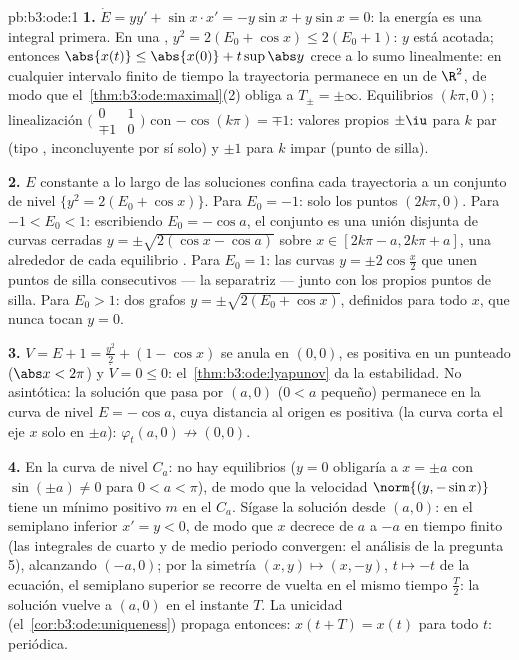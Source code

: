 \begin{solution}{pb:b3:ode:1}
\textbf{1.} $\dot E = yy' + \sin x\cdot x' = -y\sin x +
y\sin x = 0$: la energía es una integral primera. En una
,
$y^2 = 2(E_0 + \cos x) \leq 2(E_0 + 1)$: $y$ está acotada; entonces
$\abs{x(t)} \leq \abs{x(0)} +
t\sup\abs y$ crece a lo sumo linealmente: en cualquier intervalo finito
de tiempo la trayectoria permanece en un
 de $\R^2$, de modo que
el~\cref{thm:b3:ode:maximal}(2) obliga a $T_\pm = \pm\infty$.
Equilibrios $(k\pi, 0)$; linealización $\bigl(\begin{smallmatrix}0&1\\
\mp1&0\end{smallmatrix}\bigr)$ con $-\cos(k\pi) = \mp1$: valores propios
$\pm\iu$ para $k$ par (tipo ,
inconcluyente por sí solo) y $\pm1$ para $k$ impar (punto de silla).

\textbf{2.} $E$ constante a lo largo de las soluciones confina cada
trayectoria a un conjunto de nivel $\{y^2 = 2(E_0 + \cos x)\}$. Para
$E_0 = -1$: solo los puntos $(2k\pi, 0)$. Para $-1 < E_0 <
1$: escribiendo $E_0 = -\cos a$, el conjunto es una unión disjunta de
curvas cerradas $y = \pm\sqrt{2(\cos x - \cos a)}$ sobre $x \in
[2k\pi - a, 2k\pi + a]$, una alrededor de cada equilibrio
. Para $E_0 = 1$: las curvas
$y = \pm2\cos\frac x2$ que unen puntos de silla consecutivos --- la
separatriz --- junto con los propios puntos de silla. Para $E_0 > 1$:
dos grafos $y =
\pm\sqrt{2(E_0 + \cos x)}$, definidos para todo $x$, que nunca tocan
$y = 0$.

\textbf{3.} $V = E + 1 = \frac{y^2}2 + (1 - \cos x)$
se anula en $(0,0)$, es positiva en un
 punteado ($\abs x < 2\pi$) y
$\dot V = 0 \leq 0$: el~\cref{thm:b3:ode:lyapunov} da la estabilidad. No
asintótica: la solución que pasa por $(a, 0)$ ($0 < a$ pequeño)
permanece en la curva de nivel $E = -\cos a$, cuya distancia al origen
es positiva (la curva corta el eje $x$ solo en $\pm a$):
$\varphi_t(a, 0) \not\to (0,0)$.

\textbf{4.} En la curva de nivel $C_a$: no hay equilibrios ($y = 0$
obligaría a $x = \pm a$ con $\sin(\pm a) \neq 0$ para $0 < a <
\pi$), de modo que la velocidad $\norm{(y, -\sin x)}$ tiene un mínimo
positivo $m$ en el  $C_a$.
Sígase la solución desde $(a, 0)$: en el semiplano inferior
$x' = y < 0$, de modo que $x$ decrece de $a$ a $-a$ en tiempo finito
(las integrales de cuarto y de medio periodo convergen: el análisis de
la pregunta 5), alcanzando $(-a, 0)$; por la simetría
$(x, y) \mapsto (x, -y)$, $t
\mapsto -t$ de la ecuación, el semiplano superior se recorre de vuelta
en el mismo tiempo $\frac T2$: la solución vuelve a $(a, 0)$ en el
instante $T$. La unicidad (el~\cref{cor:b3:ode:uniqueness}) propaga
entonces: $x(t + T) =
x(t)$ para todo $t$: periódica.


\end{solution}
